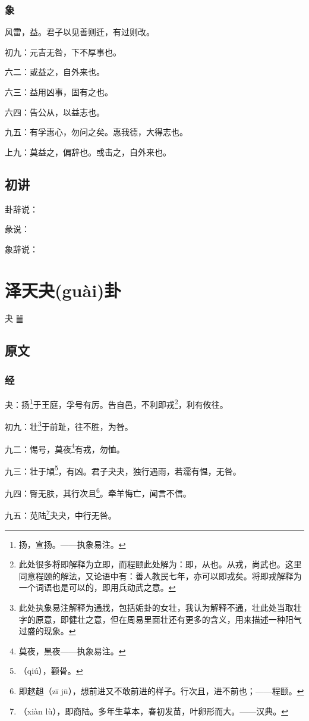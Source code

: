 \documentclass[12pt,oneside]{book}
\begin{document}
\subsection{象}
风雷，益。君子以见善则迁，有过则改。

初九：元吉无咎，下不厚事也。

六二：或益之，自外来也。

六三：益用凶事，固有之也。

六四：告公从，以益志也。

九五：有孚惠心，勿问之矣。惠我德，大得志也。

上九：莫益之，偏辞也。或击之，自外来也。

\section{初讲}
卦辞说：

彖说：

象辞说：

\chapter{泽天夬(guài)卦}
夬 {\Large ䷪}
\section{原文}

\subsection{经}
夬：扬\footnote{扬，宣扬。——执象易注。}于王庭，孚号有厉。告自邑，不利即戎\footnote{此处很多将即解释为立即，而程颐此处解为：即，从也。从戎，尚武也。这里同意程颐的解法，又论语中有：善人教民七年，亦可以即戎矣。将即戎解释为一个词语也是可以的，即用兵动武之意。}，利有攸往。

初九：壮\footnote{此处执象易注解释为通戕，包括姤卦的女壮，我认为解释不通，壮此处当取壮字的原意，即健壮之意，但在周易里面壮还有更多的含义，用来描述一种阳气过盛的现象。}于前趾，往不胜，为咎。

九二：惕号，莫夜\footnote{莫夜，黑夜——执象易注。}有戎，勿恤。

九三：壮于頄\footnote{（qiú），颧骨。}，有凶。君子夬夬，独行遇雨，若濡有愠，无咎。

九四：臀无肤，其行次且\footnote{即趑趄（zī jū），想前进又不敢前进的样子。行次且，进不前也；——程颐。}。牵羊悔亡，闻言不信。

九五：苋陆\footnote{（xiàn lù），即商陆。多年生草本，春初发苗，叶卵形而大。——汉典。}夬夬，中行无咎。
\end{document}
